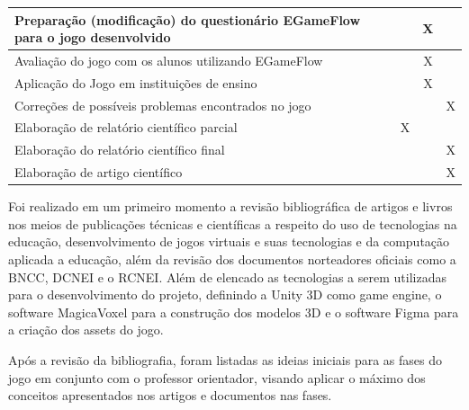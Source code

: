 \documentclass[article,12pt,openany,oneside,a4paper,english,brazil]{abntex2}
\begin{document}
\begin{table}[ht]
\begin{tabular}{|p{13cm}|c|c|c|c|}
Preparação (modificação) do questionário EGameFlow para o jogo desenvolvido                              &                       &                        & X                      &                       \\ \hline
Avaliação do jogo com os alunos utilizando EGameFlow                                                     &                       &                        & X                      &                       \\ \hline
Aplicação do Jogo em instituições de ensino                                                 &                       &                        & X                      &                       \\\hline
Correções de possíveis problemas encontrados no jogo                                                     &                       &                        &                        & X                     \\ \hline
Elaboração de relatório científico parcial                                                               &                       & X                      &                        &                       \\ \hline
Elaboração do relatório científico final                                                                 &                       &                        &                        & X                     \\ \hline
Elaboração de artigo científico                                                                          &                       &                        &                        & X                     \\ \hline
\end{tabular}
\end{table}

Foi realizado em um primeiro momento a revisão bibliográfica de artigos e livros nos meios de publicações técnicas e científicas a respeito do uso de tecnologias na educação, desenvolvimento de jogos virtuais e suas tecnologias e da computação aplicada a educação, além da revisão dos documentos norteadores oficiais como a BNCC, DCNEI e o RCNEI. Além de elencado as tecnologias a serem utilizadas para o desenvolvimento do projeto, definindo a Unity 3D como game engine, o software MagicaVoxel para a construção dos modelos 3D e o software Figma para a criação dos assets do jogo.

Após a revisão da bibliografia, foram listadas as ideias iniciais para as fases do jogo em conjunto com o professor orientador, visando aplicar o máximo dos conceitos apresentados nos artigos e documentos nas fases.
\end{document}
